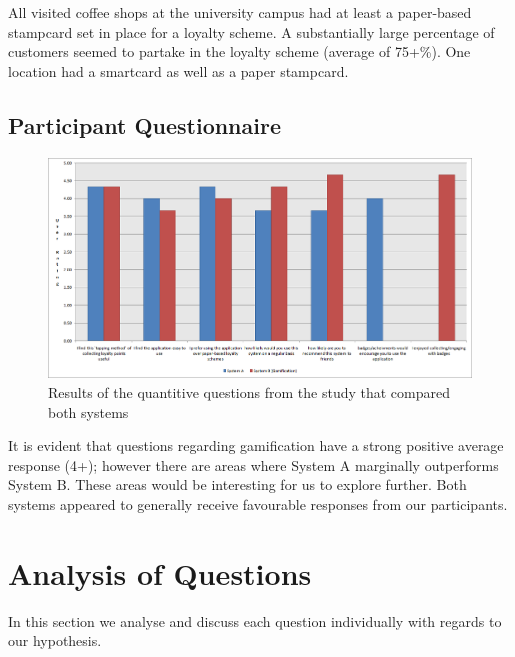 All visited coffee shops at the university campus had at least a paper-based stampcard set in place for a loyalty scheme.  A substantially large percentage of customers seemed to partake in the loyalty scheme (average of 75+\%). One location had a smartcard as well as a paper stampcard.


\subsection{Participant Questionnaire}
\begin{figure}[H]
 \centering
  \includegraphics[width=1\textwidth]{img/graph.png}
     \caption{Results of the quantitive questions from the study that compared both systems}
	 \label{participantGraph}
\end{figure}

It is evident that questions regarding gamification have a strong positive average response (4+); however there are areas where System A marginally outperforms System B. These areas would be interesting for us to explore further. Both systems appeared to generally receive favourable responses from our participants.
\newpage
\section{Analysis of Questions}
In this section we analyse and discuss each question individually with regards to our hypothesis.
